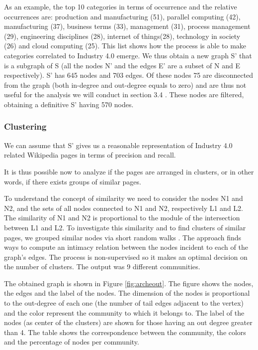 \documentclass[b5paper,]{book}
\theoremstyle{definition}
\theoremstyle{definition}
\theoremstyle{definition}
\theoremstyle{remark}
\begin{document}
As an example, the top 10 categories in terms of occurrence and the
relative occurrences are: production and manufacturing (51), parallel
computing (42), manufacturing (37), business terms (33), management
(31), process management (29), engineering disciplines (28), internet of
things(28), technology in society (26) and cloud computing (25). This
list shows how the process is able to make categories correlated to
Industry 4.0 emerge. We thus obtain a new graph S' that is a subgraph of
S (all the nodes N' and the edges E' are a subset of N and E
respectively). S' has 645 nodes and 703 edges. Of these nodes 75 are
disconnected from the graph (both in-degree and out-degree equals to
zero) and are thus not useful for the analysis we will conduct in
section 3.4 . These nodes are filtered, obtaining a definitive S' having
570 nodes.

\subsubsection*{Clustering}\label{clustering-2}

We can assume that S' gives us a reasonable representation of Industry
4.0 related Wikipedia pages in terms of precision and recall.

It is thus possible now to analyze if the pages are arranged in
clusters, or in other words, if there exists groups of similar pages.

To understand the concept of similarity we need to consider the nodes N1
and N2, and the sets of all nodes connected to N1 and N2, respectively
L1 and L2. The similarity of N1 and N2 is proportional to the module of
the intersection between L1 and L2. To investigate this similarity and
to find clusters of similar pages, we grouped similar nodes via short
random walks \citep{durrett2007random}. The approach finds ways to
compute an intimacy relation between the nodes incident to each of the
graph's edges. The process is non-supervised so it makes an optimal
decision on the number of clusters. The output was 9 different
communities.

The obtained graph is shown in Figure \ref{fig:archeout}. The figure
shows the nodes, the edges and the label of the nodes. The dimension of
the nodes is proportional to the out-degree of each one (the number of
tail edges adjacent to the vertex) and the color represent the community
to which it belongs to. The label of the nodes (as center of the
clusters) are shown for those having an out degree greater than 4. The
table shows the correspondence between the community, the colors and the
percentage of nodes per community.
\end{document}
